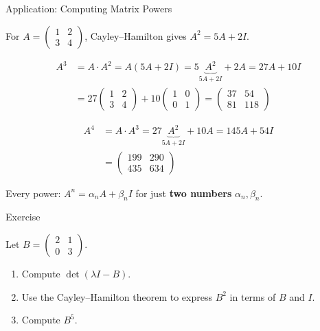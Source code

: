 \documentclass[10pt]{beamer}
\theoremstyle{definition}
\newcommand{\x}[1]{\alert{\textbf{#1}}}
\begin{document}
\begin{frame}{Application: Computing Matrix Powers}

For $A = \begin{pmatrix}1&2\\3&4\end{pmatrix}$, Cayley--Hamilton gives $A^2 = 5A + 2I$.

\vfill

\begin{align*}
A^3 &= A \cdot A^2 = A(5A+2I) = 5\underbrace{A^2}_{5A+2I} + 2A = 27A + 10I \\[6pt]
    &= 27\begin{pmatrix}1&2\\3&4\end{pmatrix} + 10\begin{pmatrix}1&0\\0&1\end{pmatrix}
     = \begin{pmatrix} 37 & 54 \\ 81 & 118 \end{pmatrix}
\end{align*}

\vfill

\begin{align*}
A^4 &= A \cdot A^3 = 27\underbrace{A^2}_{5A+2I} + 10A = 145A + 54I \\[6pt]
    &= \begin{pmatrix} 199 & 290 \\ 435 & 634 \end{pmatrix}
\end{align*}

\vfill

Every power: $A^n = \alpha_n A + \beta_n I$ for just \x{two numbers} $\alpha_n, \beta_n$.

\vfill
\end{frame}


\begin{frame}{Exercise}

\vfill

Let $B = \begin{pmatrix} 2 & 1 \\ 0 & 3 \end{pmatrix}$.

\vfill

\begin{enumerate}
\item Compute $\det(\lambda I - B)$.

\vfill

\item Use the Cayley--Hamilton theorem to express $B^2$ in terms of $B$ and $I$.

\vfill

\item Compute $B^5$.
\end{enumerate}

\vfill
\end{frame}
\end{document}
